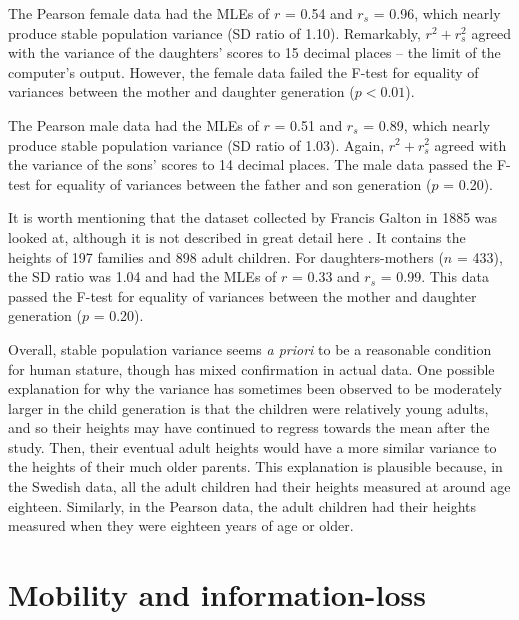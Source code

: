 \documentclass[a4paper,11pt]{article} %
\begin{document}
The Pearson female data had the MLEs of $r$ = 0.54 and $r_s$ = 0.96, which nearly produce stable population variance (SD ratio of 1.10). Remarkably, $r^2 + r_s^2$ agreed with the variance of the daughters' scores to 15 decimal places -- the limit of the computer's output. However, the female data failed the F-test for equality of variances between the mother and daughter generation ($p < 0.01$). 

The Pearson male data had the MLEs of $r$ = 0.51 and $r_s$ = 0.89, which nearly produce stable population variance (SD ratio of 1.03). Again, $r^2 + r_s^2$ agreed with the variance of the sons' scores to 14 decimal places. The male data passed the F-test for equality of variances between the father and son generation ($p$ = 0.20). 

It is worth mentioning that the dataset collected by Francis Galton in 1885 was looked at, although it is not described in great detail here \cite{galton}. It contains the heights of 197 families and 898 adult children. For daughters-mothers ($n$ = 433), the SD ratio was 1.04 and had the MLEs of $r$ = 0.33 and $r_s$ = 0.99. This data passed the F-test for equality of variances between the mother and daughter generation ($p$ = 0.20). 

Overall, stable population variance seems \emph{a priori} to be a reasonable condition for human stature, though has mixed confirmation in actual data. One possible explanation for why the variance has sometimes been observed to be moderately larger in the child generation is that the children were relatively young adults, and so their heights may have continued to regress towards the mean after the study. Then, their eventual adult heights would have a more similar variance to the heights of their much older parents. This explanation is plausible because, in the Swedish data, all the adult children had their heights measured at around age eighteen. Similarly, in the Pearson data, the adult children had their heights measured when they were eighteen years of age or older. 










\section{Mobility and information-loss}
\end{document}
